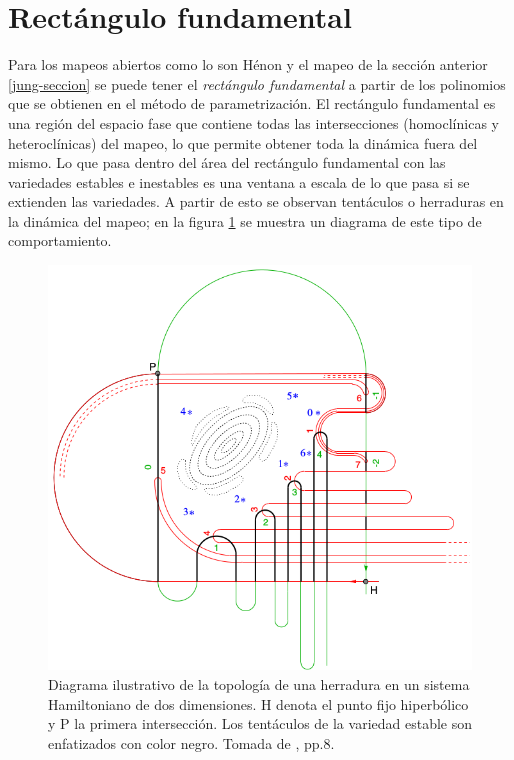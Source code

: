 \label{SeccionRectanguloFundamental}\section{Rectángulo fundamental}
Para los mapeos abiertos como lo son Hénon y el mapeo de la sección anterior \ref{jung-seccion} se puede tener el \textit{rectángulo fundamental} a partir de los polinomios que se obtienen en el método de parametrización. El rectángulo fundamental es una región del espacio fase que contiene todas las intersecciones (homoclínicas y heteroclínicas) del mapeo, lo que permite obtener toda la dinámica fuera del mismo. Lo que pasa dentro del área del rectángulo fundamental con las variedades estables e inestables es una ventana a escala de lo que pasa si se extienden las variedades. A partir de esto se observan tentáculos o herraduras en la dinámica del mapeo; en la figura \ref{herradura} se muestra un diagrama de este tipo de comportamiento.

\begin{figure}[H]
\centering
\includegraphics[scale=0.35]{herradura}
\caption{Diagrama ilustrativo de la topología de una herradura en un sistema Hamiltoniano de dos dimensiones. H denota el punto fijo hiperbólico y P la primera intersección. Los tentáculos de la variedad estable son enfatizados con color negro. Tomada de \cite{Merlo}, pp.8.}
\label{herradura}
\end{figure}

